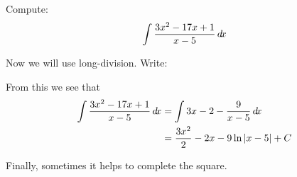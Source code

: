 \documentclass{ximera}
\begin{document}
\begin{example}
  Compute:
  \[
  \int \frac{3x^2-17x +1}{x-5} \mathop{}\!d\! x
  \]
  \begin{explanation}
    Now we will use long-division. Write:
    \begin{center}%
    \end{center}
    From this we see that
    \begin{align*}
      \int \frac{3x^2-17x +1}{x-5} \mathop{}\!d\! x &= \int 3x-2 - \frac{9}{x-5}\mathop{}\!d\! x\\
      &= \frac{3x^2}{2} - 2x -9 \ln|x-5| +C
    \end{align*}
  \end{explanation}
\end{example}

Finally, sometimes it helps to complete the square.
\end{document}
